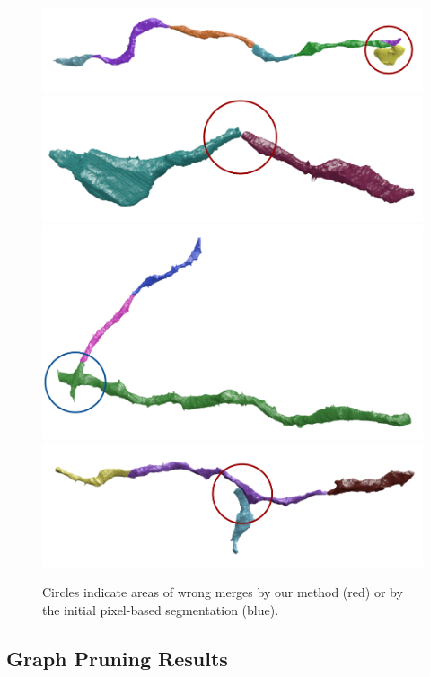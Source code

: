 \begin{figure}[t]
	\centering
	\includegraphics[width=0.85\linewidth]{./figures/VI-results/multicut-incorrect1.png}
	\includegraphics[width=0.85\linewidth]{./figures/VI-results/multicut-incorrect2.png}
	\includegraphics[width=0.85\linewidth]{./figures/VI-results/multicut-incorrect3.png}
	\includegraphics[width=0.85\linewidth]{./figures/VI-results/multicut-incorrect4.png}
	\caption{Circles indicate areas of wrong merges by our method (red) or by the initial pixel-based segmentation (blue).}
	\label{fig:negative-results}
\end{figure}


\subsection{Graph Pruning Results}

